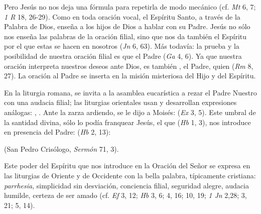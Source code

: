 	 Pero Jesús no nos deja una fórmula para repetirla de modo mecánico (cf. \emph{Mt} 6, 7; \emph{1 R} 18, 26-29). Como en toda oración vocal, el Espíritu Santo, a través de la Palabra de Dios, enseña a los hijos de Dios a hablar con su Padre. Jesús no sólo nos enseña las palabras de la oración filial, sino que nos da también el Espíritu por el que estas se hacen en nosotros  (\emph{Jn} 6, 63). Más todavía: la prueba y la posibilidad de nuestra oración filial es que el Padre  (\emph{Ga} 4, 6). Ya que nuestra oración interpreta nuestros deseos ante Dios, es también , el Padre, quien  (\emph{Rm} 8, 27). La oración al Padre se inserta en la misión misteriosa del Hijo y del Espíritu.
	
	
	 En la liturgia romana, se invita a la asamblea eucarística a rezar el Padre Nuestro con una audacia filial; las liturgias orientales usan y desarrollan expresiones análogas: , . Ante la zarza ardiendo, se le dijo a Moisés:  (\emph{Ex} 3, 5). Este umbral de la santidad divina, sólo lo podía franquear Jesús, el que  (\emph{Hb} 1, 3), nos introduce en presencia del Padre:  (\emph{Hb} 2, 13):
	
	 (San Pedro Crisólogo, \emph{Sermón} 71, 3).
	
	 Este poder del Espíritu que nos introduce en la Oración del Señor se expresa en las liturgias de Oriente y de Occidente con la bella palabra, típicamente cristiana: \emph{parrhesia}, simplicidad sin desviación, conciencia filial, seguridad alegre, audacia humilde, certeza de ser amado (cf. \emph{Ef} 3, 12; \emph{Hb} 3, 6; 4, 16; 10, 19; \emph{1 Jn} 2,28; 3, 21; 5, 14).
	
